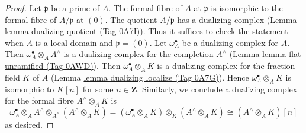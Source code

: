\documentclass{amsart}
\theoremstyle{plain}
\theoremstyle{definition}
\theoremstyle{remark}
\numberwithin{equation}{subsection}
\begin{document}
\begin{proof}
Let $\mathfrak p$ be a prime of $A$. The formal fibre of $A$ at $\mathfrak p$
is isomorphic to the formal fibre of $A/\mathfrak p$ at $(0)$. The quotient
$A/\mathfrak p$ has a dualizing complex
(Lemma \href{https://stacks.math.columbia.edu/tag/0A7I}{lemma dualizing quotient (Tag 0A7I)}).
Thus it suffices to check the statement
when $A$ is a local domain and $\mathfrak p = (0)$.
Let $\omega_A^\bullet$ be a dualizing complex for $A$. Then
$\omega_A^\bullet \otimes_A A^\wedge$ is a dualizing complex
for the completion $A^\wedge$
(Lemma \href{https://stacks.math.columbia.edu/tag/0AWD}{lemma flat unramified (Tag 0AWD)}).
Then $\omega_A^\bullet \otimes_A K$ is a dualizing
complex for the fraction field $K$ of $A$
(Lemma \href{https://stacks.math.columbia.edu/tag/0A7G}{lemma dualizing localize (Tag 0A7G)}).
Hence $\omega_A^\bullet \otimes_A K$
is isomorphic to $K[n]$ for some $n \in \mathbf{Z}$.
Similarly, we conclude a dualizing complex for the formal fibre
$A^\wedge \otimes_A K$ is
$$
\omega_A^\bullet \otimes_A A^\wedge \otimes_{A^\wedge} (A^\wedge \otimes_A K) =
(\omega_A^\bullet \otimes_A K) \otimes_K (A^\wedge \otimes_A K) \cong
(A^\wedge \otimes_A K)[n]
$$
as desired.
\end{proof}
\end{document}
